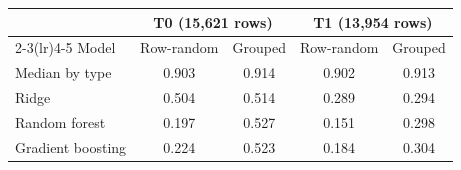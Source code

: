 \begin{tabular}{lcccc}
\toprule
 & \multicolumn{2}{c}{T0 (15{,}621 rows)} & \multicolumn{2}{c}{T1 (13{,}954 rows)} \\
\cmidrule(lr){2-3}\cmidrule(lr){4-5}
Model & Row-random & Grouped & Row-random & Grouped \\
\midrule
Median by type & 0.903 & 0.914 & 0.902 & 0.913 \\
Ridge & 0.504 & 0.514 & 0.289 & 0.294 \\
Random forest & 0.197 & 0.527 & 0.151 & 0.298 \\
Gradient boosting & 0.224 & 0.523 & 0.184 & 0.304 \\
\bottomrule
\end{tabular}
